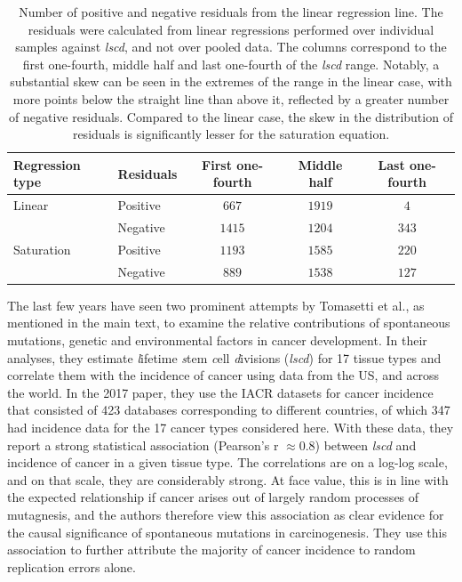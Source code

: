 \documentclass[9pt,onecolumn,twoside]{pnas-new}
\begin{document}
		\begin{table}[tbhp]
			\centering
			\caption{Number of positive and negative residuals from the linear regression line. The residuals were calculated from linear regressions performed over individual samples against \textit{lscd}, and not over pooled data. The columns correspond to the first one-fourth, middle half and last one-fourth of the \textit{lscd} range. Notably, a substantial skew can be seen in the extremes of the range in the linear case, with more points below the straight line than above it, reflected by a greater number of negative residuals. Compared to the linear case, the skew in the distribution of residuals is significantly lesser for the saturation equation.}
			\label{Table S3.2}
			\begin{tabular}[c]{m{}m{}ccc}
				\textbf{Regression type} & \textbf{Residuals} & \textbf{First one-fourth} & \textbf{Middle half} & \textbf{Last one-fourth} \\
				\midrule
				Linear & Positive & $667$ & $1919$ & $4$ \\
			  	& Negative & $1415$ & $1204$ & $343$ \\
				Saturation & Positive & $1193$ & $1585$ & $220$ \\
			 	& Negative & $889$ & $1538$ & $127$ \\
			 	\bottomrule
			\end{tabular}
		\end{table}

		The last few years have seen two prominent attempts by Tomasetti et al., as mentioned in the main text, to examine the relative contributions of spontaneous mutations, genetic and environmental factors in cancer development.  In their analyses, they estimate \textit{l}ifetime \textit{s}tem \textit{c}ell \textit{d}ivisions (\textit{lscd}) for 17 tissue types and correlate them with the incidence of cancer using data from the US, and across the world. In the 2017 paper, they use the IACR datasets for cancer incidence that consisted of 423 databases corresponding to different countries, of which 347 had incidence data for the 17 cancer types considered here. With these data, they report a strong statistical association (Pearson’s r $\approx 0.8$) between \textit{lscd} and incidence of cancer in a given tissue type. The correlations are on a log-log scale, and on that scale, they are considerably strong. At face value, this is in line with the expected relationship if cancer arises out of largely random processes of mutagnesis, and the authors therefore view this association as clear evidence for the causal significance of spontaneous mutations in carcinogenesis. They use this association to further attribute the majority of cancer incidence to random replication errors alone.
\end{document}
